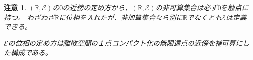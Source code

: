 \documentclass[leqno]{jsarticle}
\newtheorem*{cau}{注意}
\newcommand{\rr}{\mathbb{R}}
\begin{document}
\begin{cau}
$(\rr,\mathcal{E})$の$0$の近傍の定め方から、$(\rr,\mathcal{E})$の非可算集合は必ず$0$を触点に持つ。
わざわざ$\rr$に位相を入れたが、非加算集合なら別に$\rr$でなくとも$\mathcal{E}$は定義できる。
\par
$\mathcal{E}$の位相の定め方は離散空間の１点コンパクト化の無限遠点の近傍を補可算にした構成である。
\end{cau}













			
\end{document}

